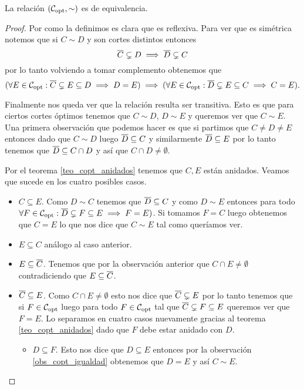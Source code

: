 \documentclass[tesis.tex]{subfiles}
\begin{document}
\begin{prop}
	La relación $({\cal C}_{\text{opt}}, \sim)$ es de equivalencia.
\end{prop}
\begin{proof}
	Por como la definimos es clara que es reflexiva.
	Para ver que es simétrica notemos que si $C \sim D$ y son cortes distintos entonces  
	\[
		\overline C \subsetneq D \implies \overline D \subsetneq C
	\]
	por lo tanto volviendo a tomar complemento obtenemos que
	\[
(	\forall E \in {\cal C}_{\text{opt}} : \overline C \subsetneq E \subseteq D \implies D = E) \implies 
	(\forall E \in {\cal C}_{\text{opt}} : \overline D \subsetneq E \subseteq C \implies C = E).
	\]
	
	Finalmente nos queda ver que la relación resulta ser transitiva.
	Esto es que para ciertos cortes óptimos tenemos que $C \sim D$, $D \sim E$ y queremos ver que $C \sim E$.
	Una primera observación que podemos hacer es que si partimos que $C \neq D \neq E$ entonces dado que $C \sim D$ luego $\overline D \subseteq C$ y similarmente $\overline D \subseteq E$ por lo tanto tenemos que $\overline D \subseteq C \cap D$ y así que $C \cap D \neq \emptyset$.

	Por el teorema \ref{teo_copt_anidados} tenemos que $C,E$ están anidados.
	Veamos que sucede en los cuatro posibles casos.
	\begin{itemize}
		\item $C \subseteq E$. 
		Como $D \sim C$ tenemos que $ \overline D \subseteq C $ y como $D \sim E$ entonces para todo $\forall F \in {\cal C}_{\text{opt}} : \overline D \subsetneq F \subseteq E \implies F = E)$. 
		Si tomamos $F = C$ luego obtenemos que $C = E$ lo que nos dice que $C \sim E$ tal como queríamos ver.
		
		
		\item $E \subseteq C$ análogo al caso anterior.
		\item $E \subseteq \overline C$.
		Tenemos que por la observación anterior que $C \cap E \neq \emptyset$ contradiciendo que $E \subseteq \overline C$.
		\item $\overline C \subseteq E$.
		Como $C \cap E \neq \emptyset$ esto nos dice que $\overline C \subsetneq E$ por lo tanto tenemos que si $F \in {\cal C}_{\text{opt}}$ luego para todo $F \in {\cal C}_{\text{opt}}$ tal que $\overline C \subsetneq F \subseteq E$ queremos ver que $F=E$.
		Lo separamos en cuatro casos nuevamente gracias al teorema \ref{teo_copt_anidados} dado que $F$ debe estar anidado con $D$.
		\begin{itemize}
			\item $D \subseteq F$.
			Esto nos dice que $D \subseteq E$ entonces por la observación \ref{obs_copt_igualdad} obtenemos que $D = E$ y así $C \sim E$.
			

\end{itemize}
\end{itemize}
\end{proof}
\end{document}
